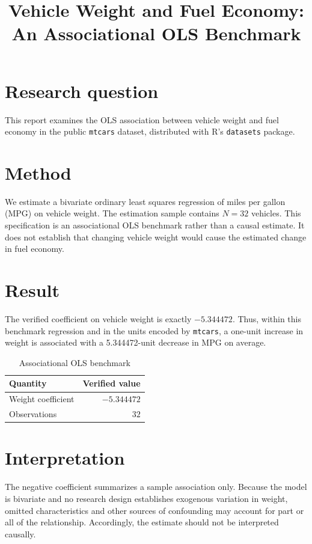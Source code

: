 \documentclass[11pt]{article}
\title{Vehicle Weight and Fuel Economy: An Associational OLS Benchmark}
\author{}
\date{}
\begin{document}
\maketitle

\section{Research question}
This report examines the OLS association between vehicle weight and fuel economy in the public \texttt{mtcars} dataset, distributed with R's \texttt{datasets} package.

\section{Method}
We estimate a bivariate ordinary least squares regression of miles per gallon (MPG) on vehicle weight. The estimation sample contains $N=32$ vehicles. This specification is an associational OLS benchmark rather than a causal estimate. It does not establish that changing vehicle weight would cause the estimated change in fuel economy.

\section{Result}
The verified coefficient on vehicle weight is exactly $-5.344472$. Thus, within this benchmark regression and in the units encoded by \texttt{mtcars}, a one-unit increase in weight is associated with a 5.344472-unit decrease in MPG on average.

\begin{table}[htbp]
\centering
\caption{Associational OLS benchmark}
\begin{tabular}{lr}
\toprule
Quantity & Verified value \\
\midrule
Weight coefficient & $-5.344472$ \\
Observations & $32$ \\
\bottomrule
\end{tabular}
\end{table}

\section{Interpretation}
The negative coefficient summarizes a sample association only. Because the model is bivariate and no research design establishes exogenous variation in weight, omitted characteristics and other sources of confounding may account for part or all of the relationship. Accordingly, the estimate should not be interpreted causally.
\end{document}
